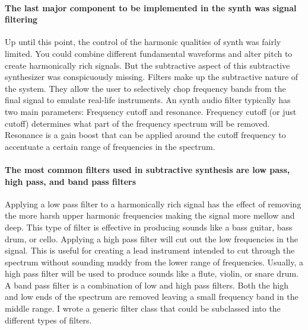 \documentclass[acmlarge,screen]{acmart}
\begin{document}
	\paragraph{The last major component to be implemented in the synth was signal filtering} Up until this point, the control of the harmonic qualities of synth was fairly limited. You could combine different fundamental waveforms and alter pitch to create harmonically rich signals. But the subtractive aspect of this subtractive synthesizer was conspicuously missing. Filters make up the subtractive nature of the system. They allow the user to selectively chop frequency bands from the final signal to emulate real-life instruments. An synth audio filter typically has two main parameters: Frequency cutoff and resonance. Frequency cutoff (or just cutoff) determines what part of the frequency spectrum will be removed. Resonance is a gain boost that can be applied around the cutoff frequency to accentuate a certain range of frequencies in the spectrum.

	\paragraph{The most common filters used in subtractive synthesis are low pass, high pass, and band pass filters} Applying a low pass filter to a harmonically rich signal has the effect of removing the more harsh upper harmonic frequencies making the signal more mellow and deep. This type of filter is effective in producing sounds like a bass guitar, bass drum, or cello. Applying a high pass filter will cut out the low frequencies in the signal. This is useful for creating a lead instrument intended to cut through the spectrum without sounding muddy from the lower range of frequencies. Usually, a high pass filter will be used to produce sounds like a flute, violin, or snare drum. A band pass filter is a combination of low and high pass filters. Both the high and low ends of the spectrum are removed leaving a small frequency band in the middle range. I wrote a generic filter class that could be subclassed into the different types of filters.
	
\end{document}
